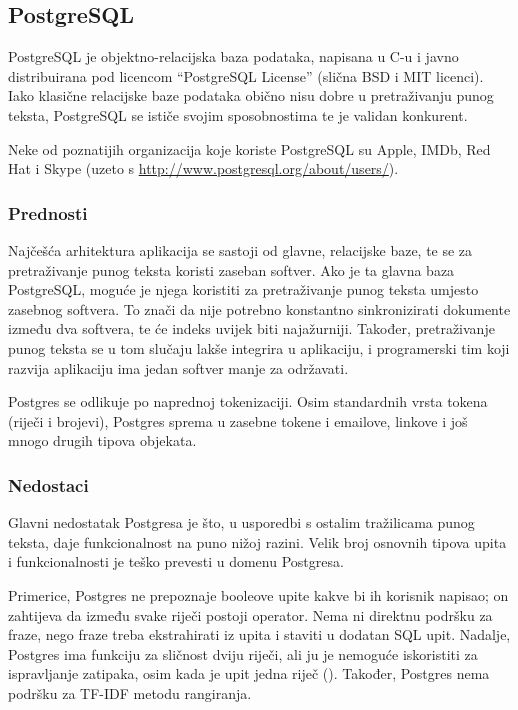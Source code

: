 \documentclass[a4paper,twoside,12pt]{scrreprt}
\begin{document}
\subsection{PostgreSQL}

PostgreSQL je objektno-relacijska baza podataka, napisana u C-u i javno distribuirana pod licencom ``PostgreSQL License'' (slična BSD i MIT licenci). Iako klasične relacijske baze podataka obično nisu dobre u pretraživanju punog teksta, PostgreSQL se ističe svojim sposobnostima te je validan konkurent.

Neke od poznatijih organizacija koje koriste PostgreSQL su Apple, IMDb, Red Hat i Skype (uzeto s \url{http://www.postgresql.org/about/users/}).

\subsubsection{Prednosti}

Najčešća arhitektura aplikacija se sastoji od glavne, relacijske baze, te se za pretraživanje punog teksta koristi zaseban softver. Ako je ta glavna baza PostgreSQL, moguće je njega koristiti za pretraživanje punog teksta umjesto zasebnog softvera. To znači da nije potrebno konstantno sinkronizirati dokumente između dva softvera, te će indeks uvijek biti najažurniji. Također, pretraživanje punog teksta se u tom slučaju lakše integrira u aplikaciju, i programerski tim koji razvija aplikaciju ima jedan softver manje za održavati.

Postgres se odlikuje po naprednoj tokenizaciji. Osim standardnih vrsta tokena (riječi i brojevi), Postgres sprema u zasebne tokene i emailove, linkove i još mnogo drugih tipova objekata.

\subsubsection{Nedostaci}

Glavni nedostatak Postgresa je što, u usporedbi s ostalim tražilicama punog teksta, daje funkcionalnost na puno nižoj razini. Velik broj osnovnih tipova upita i funkcionalnosti je teško prevesti u domenu Postgresa.

Primerice, Postgres ne prepoznaje booleove upite kakve bi ih korisnik napisao; on zahtijeva da između svake riječi postoji operator. Nema ni direktnu podršku za fraze, nego fraze treba ekstrahirati iz upita i staviti u dodatan SQL upit. Nadalje, Postgres ima funkciju za sličnost dviju riječi, ali ju je nemoguće iskoristiti za ispravljanje zatipaka, osim kada je upit jedna riječ (\cite{goodenough}). Također, Postgres nema podršku za TF-IDF metodu rangiranja.
\end{document}
